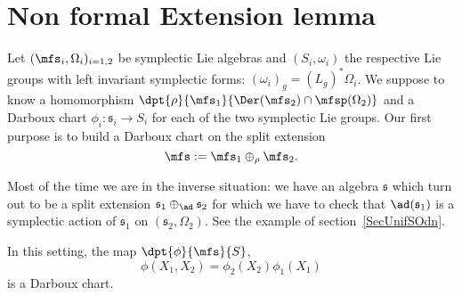 \section{Non formal Extension lemma}        \label{SecExtLem}

Let $(\mfs_i,\Omega_i)_{i=1,2}$ be  symplectic Lie algebras and $(S_i,\omega_i)$ the respective Lie groups with left invariant symplectic forms: $(\omega_i)_g=(L_g)^*\Omega_i$.
We suppose to know a homomorphism  $\dpt{\rho}{\mfs_1}{\Der(\mfs_2)\cap\mfsp(\Omega_2)}$ and a Darboux chart $\phi_i\colon \mathfrak{s}_i\to S_i$ for each of the two symplectic Lie groups. Our first purpose is to build a Darboux chart on the split extension
\[
	\mfs:=\mfs_1\oplus_{\rho}\mfs_2.
\]

\begin{remark}
	Most of the time we are in the inverse situation: we have an algebra $\mathfrak{s}$ which turn out to be a split extension $\mathfrak{s}_{1}\oplus_{\ad}\mathfrak{s}_{2}$ for which we have to check that $\ad(\mathfrak{s}_{1})$ is a symplectic action of $\mathfrak{s}_{1}$ on $(\mathfrak{s}_{2},\Omega_{2})$. See the example of section~\ref{SecUnifSOdn}.
\end{remark}

\begin{proposition}
	In this setting, the map $\dpt{\phi}{\mfs}{S}$,
	\begin{equation}
		\phi(X_1,X_2)=\phi_2(X_2)\phi_1(X_1)
	\end{equation}
	is a Darboux chart.
	\label{prop:Darboux}
\end{proposition}

